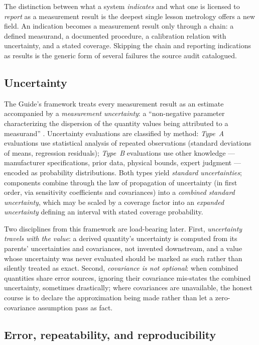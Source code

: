 The distinction between what a system \emph{indicates} and what one is licensed to \emph{report} as a measurement result is the deepest single lesson metrology offers a new field. An indication becomes a measurement result only through a chain: a defined measurand, a documented procedure, a calibration relation with uncertainty, and a stated coverage. Skipping the chain and reporting indications as results is the generic form of several failures the source audit catalogued.

\subsection{Uncertainty}\label{ch02:metrology:uncertainty}

The Guide's framework treats every measurement result as an estimate accompanied by a \emph{measurement uncertainty}: a ``non-negative parameter characterizing the dispersion of the quantity values being attributed to a measurand'' \cite{vim,gum}. Uncertainty evaluations are classified by method: \emph{Type~A} evaluations use statistical analysis of repeated observations (standard deviations of means, regression residuals); \emph{Type~B} evaluations use other knowledge --- manufacturer specifications, prior data, physical bounds, expert judgment --- encoded as probability distributions. Both types yield \emph{standard uncertainties}; components combine through the law of propagation of uncertainty (in first order, via sensitivity coefficients and covariances) into a \emph{combined standard uncertainty}, which may be scaled by a coverage factor into an \emph{expanded uncertainty} defining an interval with stated coverage probability.

Two disciplines from this framework are load-bearing later. First, \emph{uncertainty travels with the value}: a derived quantity's uncertainty is computed from its parents' uncertainties and covariances, not invented downstream, and a value whose uncertainty was never evaluated should be marked as such rather than silently treated as exact. Second, \emph{covariance is not optional}: when combined quantities share error sources, ignoring their covariance mis-states the combined uncertainty, sometimes drastically; where covariances are unavailable, the honest course is to declare the approximation being made rather than let a zero-covariance assumption pass as fact.

\subsection{Error, repeatability, and reproducibility}\label{ch02:metrology:error}

